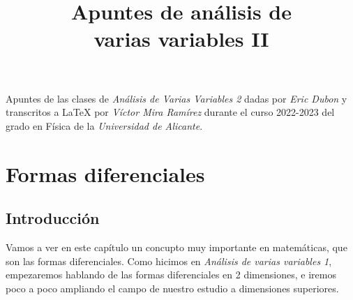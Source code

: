\documentclass{report}
\title{\Huge{Apuntes de análisis de\\ varias variables II}}
\author{}
\date{\number\year}
\begin{document}
\maketitle
\clearpage
\noindent Apuntes de las clases de \textit{Análisis de Varias Variables 2} dadas por \textit{Eric Dubon} y transcritos a \LaTeX
\hspace{0cm} por \textit{Víctor Mira Ramírez} durante el curso 2022-2023 del grado en Física de la \textit{Universidad de Alicante}.
\pagebreak
\tableofcontents
\pagebreak

\chapter{Formas diferenciales}
  \section*{Introducción}
    \noindent Vamos a ver en este capítulo un concupto muy importante en matemáticas, que son las formas diferenciales. Como hicimos en \textit{Análisis de varias variables 1}, empezaremos hablando de las formas diferenciales en 2 dimensiones, e iremos poco a poco ampliando el campo de nuestro estudio a dimensiones superiores.
\end{document}
